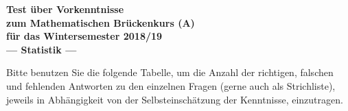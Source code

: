 \documentclass[12pt]{exam}
\begin{document}
\newcommand{\lansel}[2]{#1}

\setlength{\parindent}{0pt}
\pagestyle{empty}


\begin{center}
\textbf{\LARGE Test \"uber Vorkenntnisse} \\ \vspace{1ex}
\textbf{\large zum Mathematischen Brückenkurs (A)} \\ \vspace{1ex}
\textbf{\large f\"ur das Wintersemester 2018/19} \\ \vspace{0.5cm}
\textbf{\Large --- Statistik ---}
\end{center}
\normalsize\vspace{0.2cm}


\vspace{0.2cm}
\small
Bitte benutzen Sie die folgende Tabelle, um die Anzahl der richtigen, falschen und fehlenden Antworten zu den einzelnen Fragen (gerne auch als Strichliste), jeweils in Abhängigkeit von der Selbsteinschätzung der Kenntnisse, einzutragen. \\
\end{document}
